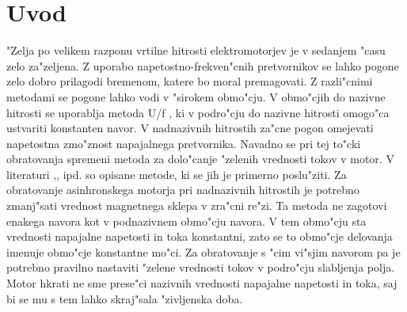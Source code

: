 \documentclass[journal,a4paper,twoside]{sty/IEEEtran}
\begin{document}

\section{Uvod}


"Zelja po velikem razponu vrtilne hitrosti elektromotorjev je v sedanjem "casu zelo za"zeljena. Z uporabo napetostno-frekven"cnih pretvornikov se lahko pogone zelo dobro prilagodi bremenom, katere bo moral premagovati. Z razli"cnimi metodami se pogone lahko vodi v "sirokem obmo"cju. V obmo"cjih do nazivne hitrosti se uporablja metoda U/f \cite{servopogoni}, ki v podro"cju do nazivne hitrosti omogo"ca ustvariti konstanten navor. 
V nadnazivnih hitrostih za"cne pogon omejevati napetostna zmo"znost napajalnega pretvornika.  Navadno se pri tej to"cki obratovanja spremeni metoda za dolo"canje "zelenih vrednosti tokov v motor. V literaturi \cite{servopogoni},\cite{miljavc},\cite{vas} ipd. so opisane metode, ki se jih je primerno poslu"ziti. Za obratovanje asinhronskega motorja pri nadnazivnih hitrostih je potrebno zmanj"sati vrednost magnetnega sklepa v zra"cni re"zi. Ta metoda ne zagotovi enakega navora kot v podnazivnem obmo"cju navora. V tem obmo"cju sta vrednosti napajalne napetosti in toka konstantni, zato se to obmo"cje delovanja imenuje obmo"cje konstantne mo"ci. Za obratovanje s "cim vi"sjim navorom pa je potrebno pravilno nastaviti "zelene vrednosti tokov v podro"cju slabljenja polja. Motor hkrati ne sme prese"ci nazivnih vrednosti napajalne napetosti in toka, saj bi se mu s tem lahko skraj"sala "zivljenska doba. 
\end{document}
